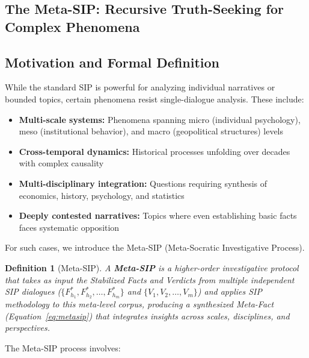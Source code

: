 \documentclass[11pt,a4paper]{article}
\newtheorem{definition}{Definition}[section]
\begin{document}
\begin{small}
\section{The Meta-SIP: Recursive Truth-Seeking for Complex Phenomena}

\subsection{Motivation and Formal Definition}

While the standard SIP is powerful for analyzing individual narratives or bounded topics, certain phenomena resist single-dialogue analysis. These include:

\begin{itemize}[nosep]
    \item \textbf{Multi-scale systems:} Phenomena spanning micro (individual psychology), meso (institutional behavior), and macro (geopolitical structures) levels
    \item \textbf{Cross-temporal dynamics:} Historical processes unfolding over decades with complex causality
    \item \textbf{Multi-disciplinary integration:} Questions requiring synthesis of economics, history, psychology, and statistics
    \item \textbf{Deeply contested narratives:} Topics where even establishing basic facts faces systematic opposition
\end{itemize}

For such cases, we introduce the Meta-SIP (Meta-Socratic Investigative Process).

\begin{definition}[Meta-SIP]
A \textbf{Meta-SIP} is a higher-order investigative protocol that takes as input the Stabilized Facts and Verdicts from multiple independent SIP dialogues ($\{F_{h_1}^*, F_{h_2}^*, \ldots, F_{h_m}^*\}$ and $\{V_1, V_2, \ldots, V_m\}$) and applies SIP methodology to this meta-level corpus, producing a synthesized Meta-Fact (Equation~\ref{eq:metasip}) that integrates insights across scales, disciplines, and perspectives.
\end{definition}

The Meta-SIP process involves:


\end{small}
\end{document}
